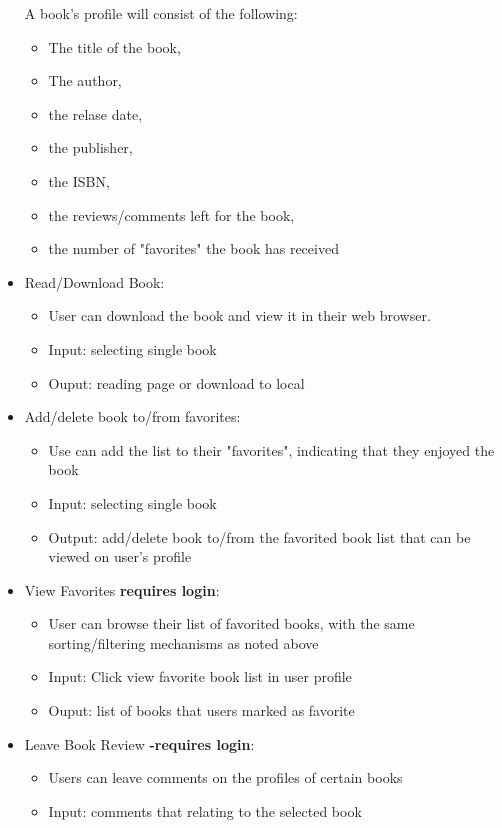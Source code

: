 \documentclass[letter, 12pt, titlepage]{article}
\begin{document}
\begin{itemize}
		A book's profile will consist of the following:
		\begin{itemize}
			\item The title of the book,
			\item The author,
			\item the relase date,
			\item the publisher,
			\item the ISBN,
			\item the reviews/comments left for the book,
			\item the number of "favorites" the book has received
		\end{itemize}
	\item Read/Download Book:
		\begin{itemize}
			\item  User can download the book and view it in their web browser.
			\item  Input: selecting single book
			\item  Ouput: reading page or download to local
		\end{itemize}
	\item Add/delete book to/from favorites:
		\begin{itemize}
			\item  Use can add the list to their "favorites", indicating that they enjoyed the book
			\item  Input: selecting single book
			\item  Output: add/delete book to/from the favorited book list that can be viewed on user's profile
		\end{itemize}
	\item  View Favorites  \textbf{requires login}:
		\begin{itemize}
			\item  User can browse their list of favorited books, with the same sorting/filtering mechanisms as noted above
			\item  Input: Click view favorite book list in user profile
			\item  Ouput: list of books that users marked as favorite
		\end{itemize}
	\item Leave Book Review \textbf{-requires login}: 
		\begin{itemize}
			\item  Users can leave comments on the profiles of certain books
			\item  Input: comments that relating to the selected book

\end{itemize}
\end{itemize}
\end{document}

